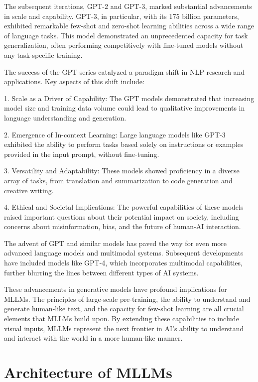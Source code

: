 The subsequent iterations, GPT-2 and GPT-3, marked substantial advancements in scale and capability. GPT-3, in particular, with its 175 billion parameters, exhibited remarkable few-shot and zero-shot learning abilities across a wide range of language tasks. This model demonstrated an unprecedented capacity for task generalization, often performing competitively with fine-tuned models without any task-specific training.

The success of the GPT series catalyzed a paradigm shift in NLP research and applications. Key aspects of this shift include:

1. Scale as a Driver of Capability: The GPT models demonstrated that increasing model size and training data volume could lead to qualitative improvements in language understanding and generation.

2. Emergence of In-context Learning: Large language models like GPT-3 exhibited the ability to perform tasks based solely on instructions or examples provided in the input prompt, without fine-tuning.

3. Versatility and Adaptability: These models showed proficiency in a diverse array of tasks, from translation and summarization to code generation and creative writing.

4. Ethical and Societal Implications: The powerful capabilities of these models raised important questions about their potential impact on society, including concerns about misinformation, bias, and the future of human-AI interaction.

The advent of GPT and similar models has paved the way for even more advanced language models and multimodal systems. Subsequent developments have included models like GPT-4, which incorporates multimodal capabilities, further blurring the lines between different types of AI systems.

These advancements in generative models have profound implications for MLLMs. The principles of large-scale pre-training, the ability to understand and generate human-like text, and the capacity for few-shot learning are all crucial elements that MLLMs build upon. By extending these capabilities to include visual inputs, MLLMs represent the next frontier in AI's ability to understand and interact with the world in a more human-like manner.

\section{Architecture of MLLMs}

